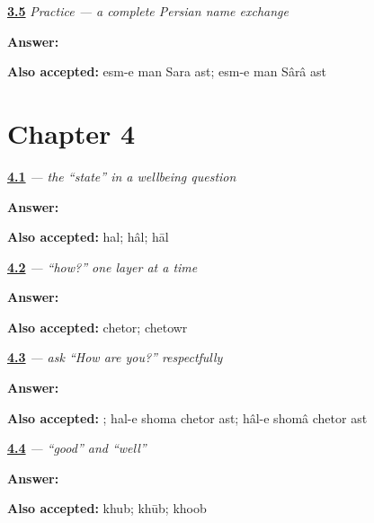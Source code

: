 \noindent\begin{minipage}[t]{\linewidth}
\raggedright
\hyperlink{review-FA-C03-practice-next-line}{\textbf{3.5}} \emph{Practice — a complete Persian name exchange}\par
\small \textbf{Answer:}    \par
\footnotesize \textbf{Also accepted:} esm-e man Sara ast; esm-e man Sârâ ast
\end{minipage}\par\medskip

\section*{Chapter 4}

\noindent\begin{minipage}[t]{\linewidth}
\raggedright
\hyperlink{review-FA-C04-hal-meaning}{\textbf{4.1}} \emph{ — the “state” in a wellbeing question}\par
\small \textbf{Answer:} \par
\footnotesize \textbf{Also accepted:} hal; hâl; hāl
\end{minipage}\par\medskip

\noindent\begin{minipage}[t]{\linewidth}
\raggedright
\hyperlink{review-FA-C04-chetor-how}{\textbf{4.2}} \emph{ — “how?” one layer at a time}\par
\small \textbf{Answer:} \par
\footnotesize \textbf{Also accepted:} chetor; chetowr
\end{minipage}\par\medskip

\noindent\begin{minipage}[t]{\linewidth}
\raggedright
\hyperlink{review-FA-C04-hal-e-shoma-chetor-ast-question}{\textbf{4.3}} \emph{    — ask “How are you?” respectfully}\par
\small \textbf{Answer:}    \par
\footnotesize \textbf{Also accepted:}    ; hal-e shoma chetor ast; hâl-e shomâ chetor ast
\end{minipage}\par\medskip

\noindent\begin{minipage}[t]{\linewidth}
\raggedright
\hyperlink{review-FA-C04-khub-good}{\textbf{4.4}} \emph{ — “good” and “well”}\par
\small \textbf{Answer:} \par
\footnotesize \textbf{Also accepted:} khub; khūb; khoob
\end{minipage}\par\medskip

